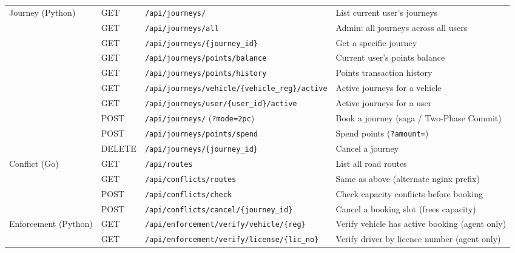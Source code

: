 \documentclass[12pt,a4paper]{article}
\begin{document}
\begin{table}[H]
\begin{tabularx}{\textwidth}{L{1.6cm} @{\hspace{6pt}} L{1.1cm} @{\hspace{6pt}} L{6.2cm} @{\hspace{6pt}} X}
  Journey (Python)
    & GET    & \texttt{/api/journeys/}                                      & List current user's journeys \\
    & GET    & \texttt{/api/journeys/all}                                   & Admin: all journeys across all users \\
    & GET    & \texttt{/api/journeys/\{journey\_id\}}                       & Get a specific journey \\
    & GET    & \texttt{/api/journeys/points/balance}                        & Current user's points balance \\
    & GET    & \texttt{/api/journeys/points/history}                        & Points transaction history \\
    & GET    & \texttt{/api/journeys/vehicle/\{vehicle\_reg\}/active}       & Active journeys for a vehicle \\
    & GET    & \texttt{/api/journeys/user/\{user\_id\}/active}              & Active journeys for a user \\
    & POST   & \texttt{/api/journeys/} (\texttt{?mode=2pc})                 & Book a journey (saga / Two-Phase Commit) \\
    & POST   & \texttt{/api/journeys/points/spend}                          & Spend points (\texttt{?amount=}) \\
    & DELETE & \texttt{/api/journeys/\{journey\_id\}}                       & Cancel a journey \\
  \midrule
 
  Conflict (Go)
    & GET    & \texttt{/api/routes}                                         & List all road routes \\
    & GET    & \texttt{/api/conflicts/routes}                               & Same as above (alternate nginx prefix) \\
    & POST   & \texttt{/api/conflicts/check}                                & Check capacity conflicts before booking \\
    & POST   & \texttt{/api/conflicts/cancel/\{journey\_id\}}               & Cancel a booking slot (frees capacity) \\
  \midrule
 
  Enforcement (Python)
    & GET    & \texttt{/api/enforcement/verify/vehicle/\{reg\}}    & Verify vehicle has active booking (agent only) \\
    & GET    & \texttt{/api/enforcement/verify/license/\{lic\_no\}} & Verify driver by licence number (agent only) \\
  \midrule
 

\end{tabularx}
\end{table}
\end{document}
